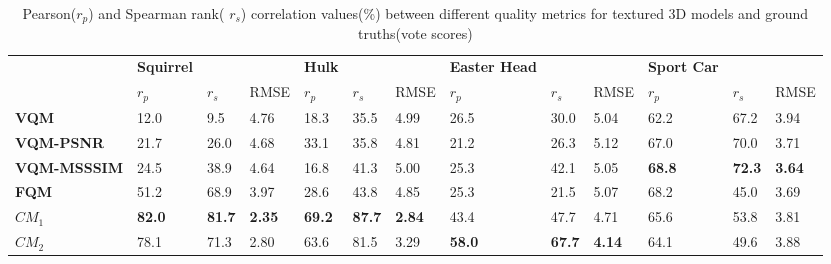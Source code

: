 \begin{table}[]
\centering
\caption{Pearson($r_p$) and Spearman rank( $r_s$) correlation values(\%) between different quality metrics for textured 3D models and ground truths(vote scores)}
\label{my-label}
\begin{tabular}{lllllllllllll}
                     & \textbf{Squirrel} &               &      & \textbf{Hulk} &               &      & \textbf{Easter Head} &               &      & \textbf{Sport Car} &               &      \\
                    & $r_p$                & $r_s$           & RMSE & $r_p$                & $r_s$            & RMSE & $r_p$                & $r_s$            & RMSE &$r_p$                & $r_s$            & RMSE \\
\textbf{VQM}        & 12.0     & 9.5  &   4.76   & 18.3 & 35.5 &   4.99   & 26.5        & 30.0 &   5.04   & 62.2      & 67.2 &   3.94   \\
\textbf{VQM-PSNR}   & 21.7     & 26.0 &   4.68   & 33.1 & 35.8 &   4.81   & 21.2        & 26.3 &   5.12   & 67.0      & 70.0 &    3.71  \\
\textbf{VQM-MSSSIM} & 24.5     & 38.9 &   4.64  & 16.8 & 41.3 &   5.00   & 25.3        & 42.1 &   5.05   & \textbf{68.8}      & \textbf{72.3} & \textbf{ 3.64}    \\
\textbf{FQM}  \cite{Tian_2004}     & 51.2     & 68.9 &   3.97   & 28.6 & 43.8 &    4.85   & 25.3        & 21.5 &    5.07   & 68.2      & 45.0 &    3.69   \\
$CM_1$        & \textbf{82.0}     & \textbf{81.7} &  \textbf{2.35}    & \textbf{69.2} & \textbf{87.7} &  \textbf{2.84 }  & 43.4        & 47.7 &  4.71   & 65.6      & 53.8 &   3.81 \\
$CM_2$        & 78.1     & 71.3 &   2.80   & 63.6 & 81.5 &  3.29    & \textbf{58.0 }       & \textbf{67.7} &   \textbf{ 4.14}  & 64.1      & 49.6 &    3.88 
\end{tabular}
\end{table}
